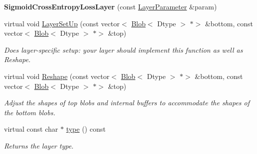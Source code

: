 \begin{DoxyCompactItemize}
{\bfseries Sigmoid\+Cross\+Entropy\+Loss\+Layer} (const \mbox{\hyperlink{classcaffe_1_1_layer_parameter}{Layer\+Parameter}} \&param)
\item 
virtual void \mbox{\hyperlink{classcaffe_1_1_sigmoid_cross_entropy_loss_layer_ac67af0cc1033db08d47a3f56aff5d600}{Layer\+Set\+Up}} (const vector$<$ \mbox{\hyperlink{classcaffe_1_1_blob}{Blob}}$<$ Dtype $>$ $\ast$$>$ \&bottom, const vector$<$ \mbox{\hyperlink{classcaffe_1_1_blob}{Blob}}$<$ Dtype $>$ $\ast$$>$ \&top)
\begin{DoxyCompactList}\small\item\em Does layer-\/specific setup\+: your layer should implement this function as well as Reshape. \end{DoxyCompactList}\item 
virtual void \mbox{\hyperlink{classcaffe_1_1_sigmoid_cross_entropy_loss_layer_a4199eb0668451022f8da20ebca129eb3}{Reshape}} (const vector$<$ \mbox{\hyperlink{classcaffe_1_1_blob}{Blob}}$<$ Dtype $>$ $\ast$$>$ \&bottom, const vector$<$ \mbox{\hyperlink{classcaffe_1_1_blob}{Blob}}$<$ Dtype $>$ $\ast$$>$ \&top)
\begin{DoxyCompactList}\small\item\em Adjust the shapes of top blobs and internal buffers to accommodate the shapes of the bottom blobs. \end{DoxyCompactList}\item 
\mbox{\label{classcaffe_1_1_sigmoid_cross_entropy_loss_layer_a38dd36e04f37f4692446b057a48e96e1}} 
virtual const char $\ast$ \mbox{\hyperlink{classcaffe_1_1_sigmoid_cross_entropy_loss_layer_a38dd36e04f37f4692446b057a48e96e1}{type}} () const
\begin{DoxyCompactList}\small\item\em Returns the layer type. \end{DoxyCompactList}\end{DoxyCompactItemize}
